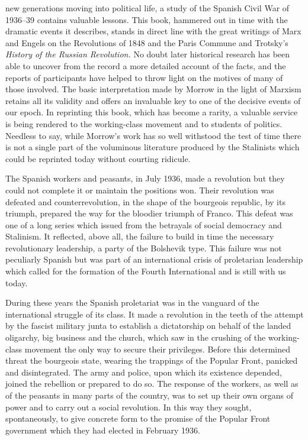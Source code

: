  new generations moving into political life, a study of the Spanish Civil War of 1936–39 contains valuable lessons. This book, hammered out in time with the dramatic events it describes, stands in direct line with the great writings of Marx and Engels on the Revolutions of 1848 and the Paris Commune and Trotsky’s \emph{History of the Russian Revolution.} No doubt later historical research has been able to uncover from the record a more detailed account of the facts, and the reports of participants have helped to throw light on the motives of many of those involved. The basic interpretation made by Morrow in the light of Marxism retains all its validity and offers an invaluable key to one of the decisive events of our epoch. In reprinting this book, which has become a rarity, a valuable service is being rendered to the working-class movement and to students of politics. Needless to say, while Morrow’s work has so well withstood the test of time there is not a single part of the voluminous literature produced by the Stalinists which could be reprinted today without courting ridicule.

The Spanish workers and peasants, in July 1936, made a revolution but they could not complete it or maintain the positions won. Their revolution was defeated and counterrevolution, in the shape of the bourgeois republic, by its triumph, prepared the way for the bloodier triumph of Franco. This defeat was one of a long series which issued from the betrayals of social democracy and Stalinism. It reflected, above all, the failure to build in time the necessary revolutionary leadership, a party of the Bolshevik type. This failure was not peculiarly Spanish but was part of an international crisis of proletarian leadership which called for the formation of the Fourth International and is still with us today.
\nowidow

During these years the Spanish proletariat was in the vanguard of the international struggle of its class. It made a revolution in the teeth of the attempt by the fascist military junta to establish a dictatorship on behalf of the landed oligarchy, big business and the church, which saw in the crushing of the working-class movement the only way to secure their privileges. Before this determined threat the bourgeois state, wearing the trappings of the Popular Front, panicked and disintegrated. The army and police, upon which its existence depended, joined the rebellion or prepared to do so. The response of the workers, as well as of the peasants in many parts of the country, was to set up their own organs of power and to carry out a social revolution. In this way they sought, spontaneously, to give concrete form to the promise of the Popular Front government which they had elected in February 1936.

